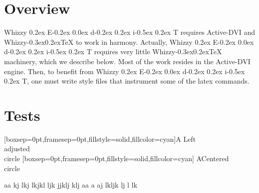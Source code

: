 \documentclass[12pt]{article}
\title{\huge \WhizzyEdit}
\author {Didier R{\'e}my}
\makeatletter
\def \ActiveDVI {Active-DVI}
\def \WhizzyTeX {{Whizzy\kern -0.3ex\raise 0.2ex\hbox{\let \@\relax\TeX}}}
\def \WhizzyEdit {Whizzy\sc 
\raise 0.2ex \hbox{E}\kern -0.2ex%
\lower 0.0ex \hbox{d}\kern -0.2ex%
\lower 0.2ex \hbox{i}\kern -0.5ex%
\raise 0.2ex \hbox{T}}%
\makeatother
\begin{document}
\maketitle

\begin{abstract}
This requires the use of \verb"advi" and of a
recent version that recognized \verb"advi: edit" specials.
See the {\ActiveDVI} and {\WhizzyEdit} related parts of the documentaion.
\end{abstract}

\section{Overview}

{\WhizzyEdit} requires {\ActiveDVI} and {\WhizzyTeX} to work in harmony. 
Actually, {\WhizzyEdit} requires very little {\WhizzyTeX} machinery, which we
describe below. Most of the work resides in the {\ActiveDVI} engine. 
Then, to benefit from {\WhizzyEdit}, one must write style files that
instrument some of the latex commands. 


\section {Tests}

\vspace {8em}

\makeatletter

\makeatletter

\noindent
{}
  [boxsep=0pt,framesep=0pt,fillstyle=solid,fillcolor=cyan]{A}%
  {Left \\adjusted\\ circle}%
   [boxsep=0pt,framesep=0pt,fillstyle=solid,fillcolor=cyan]%
   {A}{Centered\\ circle}%

  {\hsize \adviw\vbox{aa kj lkj lkjkl ljk jjklj klj  
  {}%
aa a aj lkljk lj l lk }}%
%
  {\hsize \adviw{}}%
%
  {\hsize \adviw{}}%
\end{document}
